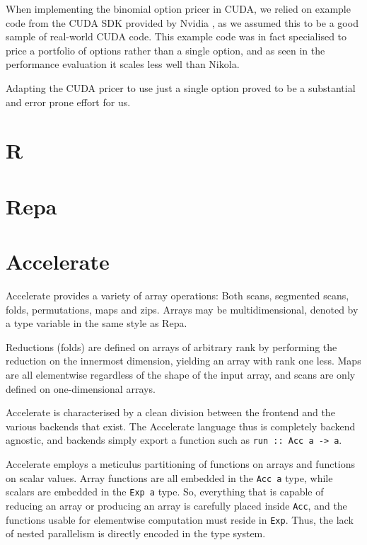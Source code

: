 When implementing the binomial option pricer in CUDA, we relied on example code
from the CUDA SDK provided by Nvidia \cite{CUDAbinomial}, as we assumed this to
be a good sample of real-world CUDA code. This example code was in fact
specialised to price a portfolio of options rather than a single option, and as
seen in the performance evaluation it scales less well than Nikola.

Adapting the CUDA pricer to use just a single option proved to be a substantial
and error prone effort for us.

\section{R}
\section{Repa}
\section{Accelerate}

Accelerate provides a variety of array operations: Both scans, segmented scans,
folds, permutations, maps and zips. Arrays may be multidimensional, denoted by
a type variable in the same style as Repa.

Reductions (folds) are defined on arrays of arbitrary rank by performing the
reduction on the innermost dimension, yielding an array with rank one less.
Maps are all elementwise regardless of the shape of the input array, and scans
are only defined on one-dimensional arrays.

Accelerate is characterised by a clean division between the frontend and the
various backends that exist. The Accelerate language thus is completely backend
agnostic, and backends simply export a function such as \hbox{\texttt{run :: Acc a ->
a}.}

Accelerate employs a meticulus partitioning of functions on arrays and functions
on scalar values. Array functions are all embedded in the \texttt{Acc a} type,
while scalars are embedded in the \texttt{Exp a} type. So, everything that is
capable of reducing an array or producing an array is carefully placed inside
\texttt{Acc}, and the functions usable for elementwise computation must
reside in \texttt{Exp}. Thus, the lack of nested parallelism is directly
encoded in the type system.


